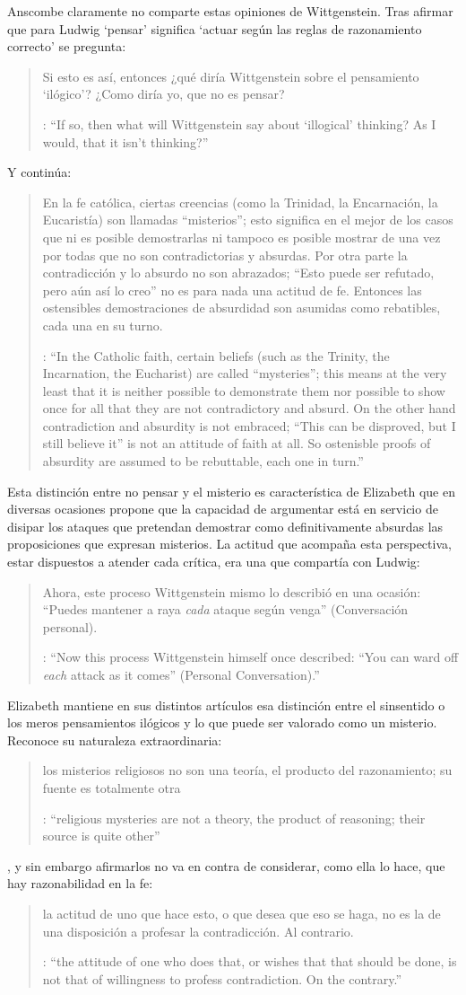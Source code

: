  Anscombe claramente no comparte estas opiniones de Wittgenstein. Tras afirmar que para Ludwig `pensar' significa \enquote*{actuar según las reglas de razonamiento correcto} se pregunta: \blockquote[{\cite[122]{anscombe1981parmenides:qli}}: \enquote{If so, then what will Wittgenstein say about `illogical' thinking? As I would, that it isn't thinking?}]{Si esto es así, entonces ¿qué diría Wittgenstein sobre el pensamiento `ilógico'? ¿Como diría yo, que no es pensar?} Y continúa: \blockquote[{\cite[122]{anscombe1981parmenides:qli}}: \enquote{In the Catholic faith, certain beliefs (such as the Trinity, the Incarnation, the Eucharist) are called ``mysteries''; this means at the very least that it is neither possible to demonstrate them nor possible to show once for all that they are not contradictory and absurd. On the other hand contradiction and absurdity is not embraced; ``This can be disproved, but I still believe it'' is not an attitude of faith at all. So ostenisble proofs of absurdity are assumed to be rebuttable, each one in turn.}]{En la fe católica, ciertas creencias (como la Trinidad, la Encarnación, la Eucaristía) son llamadas ``misterios''; esto significa en el mejor de los casos que ni es posible demostrarlas ni tampoco es posible mostrar de una vez por todas que no son contradictorias y absurdas. Por otra parte la contradicción y lo absurdo no son abrazados; ``Esto puede ser refutado, pero aún así lo creo'' no es para nada una actitud de fe. Entonces las ostensibles demostraciones de absurdidad son asumidas como rebatibles, cada una en su turno.} Esta distinción entre no pensar y el misterio es característica de Elizabeth que en diversas ocasiones propone que la capacidad de argumentar está en servicio de disipar los ataques que pretendan demostrar como definitivamente absurdas las proposiciones que expresan misterios. La actitud que acompaña esta perspectiva, estar dispuestos a atender cada crítica, era una que compartía con Ludwig: \blockquote[{\cite[122]{anscombe1981parmenides:qli}}: \enquote{Now this process Wittgenstein himself once described: ``You can ward off \emph{each} attack as it comes'' (Personal Conversation).}]{Ahora, este proceso Wittgenstein mismo lo describió en una ocasión: ``Puedes mantener a raya \emph{cada} ataque según venga'' (Conversación personal).}

  Elizabeth mantiene en sus distintos artículos esa distinción entre el sinsentido o los meros pensamientos ilógicos y lo que puede ser valorado como un misterio. Reconoce su naturaleza extraordinaria: \blockquote[{\cite[122--123]{anscombe1981parmenides:qli}}: \enquote{religious mysteries are not a theory, the product of reasoning; their source is quite other}]{los misterios religiosos no son una teoría, el producto del razonamiento; su fuente es totalmente otra}, y sin embargo afirmarlos no va en contra de considerar, como ella lo hace, que hay razonabilidad en la fe: \blockquote[{\cite[122]{anscombe1981parmenides:qli}}: \enquote{the attitude of one who does that, or wishes that that should be done, is not that of willingness to profess contradiction. On the contrary.}]{la actitud de uno que hace esto, o que desea que eso se haga, no es la de una disposición a profesar la contradicción. Al contrario.}
